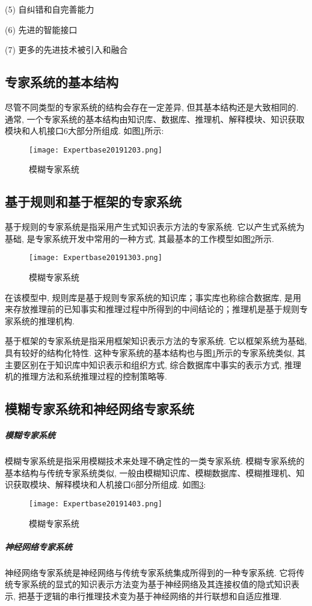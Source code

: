     (5) 自纠错和自完善能力

    (6) 先进的智能接口

    (7) 更多的先进技术被引入和融合

\subsection{专家系统的基本结构}
尽管不同类型的专家系统的结构会存在一定差异, 但其基本结构还是大致相同的. 通常, 一个专家系统的基本结构由知识库、数据库、推理机、解释模块、知识获取模块和人机接口6大部分所组成. 如图\ref{Expertbase20191203}所示:
\begin{figure}[H]
\centering
\texttt{[image: Expertbase20191203.png]}
\caption{模糊专家系统}
\label{Expertbase20191203}
\end{figure}
\subsection{基于规则和基于框架的专家系统}
基于规则的专家系统是指采用产生式知识表示方法的专家系统. 它以产生式系统为基础, 是专家系统开发中常用的一种方式, 其最基本的工作模型如图\ref{Expertbase20191303}所示.
\begin{figure}[H]
\centering
\texttt{[image: Expertbase20191303.png]}
\caption{模糊专家系统}
\label{Expertbase20191303}
\end{figure}
在该模型中, 规则库是基于规则专家系统的知识库；事实库也称综合数据库, 是用来存放推理前的已知事实和推理过程中所得到的中间结论的；推理机是基于规则专家系统的推理机构.

基于框架的专家系统是指采用框架知识表示方法的专家系统. 它以框架系统为基础, 具有较好的结构化特性. 这种专家系统的基本结构也与图\ref{Expertbase20191203}所示的专家系统类似, 其主要区别在于知识库中知识表示和组织方式, 综合数据库中事实的表示方式, 推理机的推理方法和系统推理过程的控制策略等.
\subsection{模糊专家系统和神经网络专家系统}
\subparagraph{模糊专家系统}
模糊专家系统是指采用模糊技术来处理不确定性的一类专家系统. 模糊专家系统的基本结构与传统专家系统类似, 一般由模糊知识库、模糊数据库、模糊推理机、知识获取模块、解释模块和人机接口6部分所组成. 如图\ref{Expertbase20191403}:
\begin{figure}[H]
\centering
\texttt{[image: Expertbase20191403.png]}
\caption{模糊专家系统}
\label{Expertbase20191403}
\end{figure}
\subparagraph{神经网络专家系统}
神经网络专家系统是神经网络与传统专家系统集成所得到的一种专家系统. 它将传统专家系统的显式的知识表示方法变为基于神经网络及其连接权值的隐式知识表示, 把基于逻辑的串行推理技术变为基于神经网络的并行联想和自适应推理.
